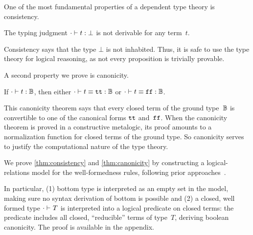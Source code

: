One of the most fundamental properties of a dependent type theory is consistency.
\begin{theorem}[Consistency]
\label{thm:consistency}
  The typing judgment $ {\cdot} \vdash {t} : {\bot} $ is not derivable for any term~$t$.
\end{theorem}

\noindent{}
Consistency says that the type $\bot$ is not inhabited.
Thus, it is safe to use the type theory for logical reasoning, as not
every proposition is trivially provable.




A second property we prove is canonicity.

\begin{theorem}[Canonicity]
\label{thm:canonicity}
  If $ {\cdot} \vdash {t} : {\mathbb{B}} $, then either $ {\cdot} \vdash {t \equiv \ensuremath{\texttt{tt}}} : {\mathbb{B}} $ or $ {\cdot} \vdash {t \equiv \ensuremath{\texttt{ff}}} : {\mathbb{B}} $.
\end{theorem}

\noindent
This canonicity theorem says that every closed term of the ground
type~$\mathbb{B}$ is convertible to one of the canonical forms $\texttt{tt}$ and~$\texttt{ff}$.
When the canonicity theorem is proved in a constructive meta\-logic, its proof
amounts to a normalization function for closed terms of the ground type.
So canonicity serves to justify the computational nature of the type theory.

We prove \cref{thm:consistency} and \cref{thm:canonicity} by constructing a logical-relations model
for the well-formedness rules, following prior approaches~\cite{coquand2018canonicity,sterling2019algebraic,kaposi2019gluing}.

In particular, (1) bottom type is interpreted as an empty set in the model, making sure no syntax derivation of bottom is possible and (2) a closed, well formed type $ {\cdot} \vdash_{} {T} $ is interpreted
into a logical predicate on closed terms: the predicate includes all
closed, ``reducible'' terms of type~$T$, deriving boolean canonicity.
The proof is available in the appendix.